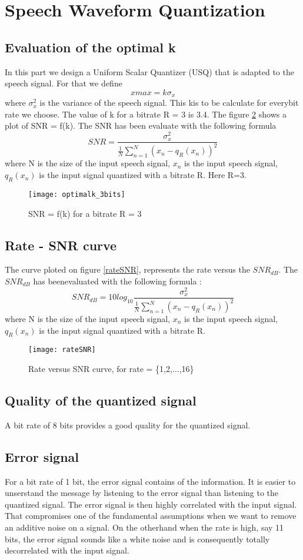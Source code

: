\section{Speech Waveform Quantization}
\subsection{Evaluation of the optimal k}
In this part we design a Uniform Scalar Quantizer (USQ) that is adapted to the speech signal. For that we define \[xmax = k\sigma_x\] where $\sigma_x^2$ is the variance of the speech signal. This kis to be calculate for everybit rate we choose. The value of k for a bitrate R = 3 is 3.4. The figure \ref{optimalk} shows a plot of SNR = f(k). The SNR has been evaluate with the following formula \[ SNR = \frac{\sigma_x^2 }{\frac{1}{N}\sum_{n=1}^N(x_n - q_R(x_n))^2 } \] where N is the size of the input speech signal, $x_n$ is the input speech signal, $q_R(x_n)$ is the input signal quantized with a bitrate R. Here R=3.



\begin{figure}[h!]
\centering
\texttt{[image: optimalk\_3bits]}
\caption{SNR = f(k) for a bitrate R = 3}
\label{optimalk}
\end{figure}

\subsection{Rate - SNR curve}
The curve ploted on figure \ref{rateSNR}, represents the rate versus the $SNR_{dB}$. The $SNR_{dB}$ has beenevaluated with the following formula : \[ SNR_{dB} = 10log_{10}\frac{\sigma_x^2}{\frac{1}{N}\sum_{n=1}^N(x_n - q_R(x_n))^2}\] where N is the size of the input speech signal, $x_n$ is the input speech signal, $q_R(x_n)$ is the input signal quantized with a bitrate R.

\begin{figure}[h!]
  \centering
  \texttt{[image: rateSNR]}
  \caption{Rate versus SNR curve, for rate = \{1,2,$\dots$,16\}}
  \label{optimalk}
\end{figure}

\subsection{Quality of the quantized signal}
A bit rate of 8 bits provides a good quality for the quantized signal.
\subsection{Error signal}
For a bit rate of 1 bit, the error signal contains of the information. It is easier to unserstand the message by listening to the error signal than listening to the quantized signal. The error signal is then highly correlated with the input signal. That compromises one of the fundamental assumptions when we want to remove an additive noise on a signal. On the otherhand when the rate is high, say 11 bits, the error signal sounds like a white noise and is consequently totally decorrelated with the input signal.

